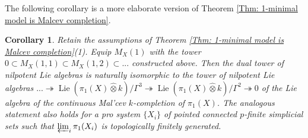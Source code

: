 \documentclass[11pt]{amsart}
\newtheorem{corollary}[theorem]{Corollary}
\theoremstyle{definition}
\numberwithin{equation}{section}
\numberwithin{equation}{section}
\DeclareMathOperator{\Lie}{Lie}
\begin{document}
The following corollary is a more elaborate version of Theorem \ref{Thm: 1-minimal model is Malcev completion}.

\begin{corollary}
Retain the assumptions of Theorem \ref{Thm: 1-minimal model is Malcev completion}(1). Equip $M_X(1)$ with the tower $0\subset M_X(1,1)\subset M_X(1,2)\subset ...$ constructed above. Then the dual tower of nilpotent Lie algebras is naturally isomorphic to the tower of nilpotent Lie algebras $...\twoheadrightarrow\Lie(\pi_1(X)\widehat{\otimes} k)/\Gamma^3\twoheadrightarrow\Lie(\pi_1(X)\widehat{\otimes} k)/\Gamma^2\twoheadrightarrow 0$ of the Lie algebra of the continuous Mal'cev $k$-completion of $\pi_1(X)$. The analogous statement also holds for a pro system $\{X_i\}$ of pointed connected $p$-finite simplicial sets such that $\varprojlim_i \pi_1(X_i)$ is topologically finitely generated.
\end{corollary}
\end{document}
